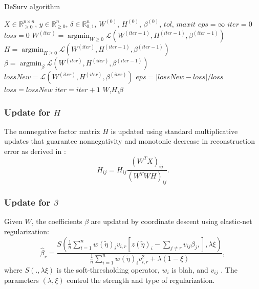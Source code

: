 \documentclass[9pt,twocolumn,twoside,]{pnas-new}
\begin{document}
\begin{algorithm}
\caption{DeSurv algorithm}\label{deSurv}
    \begin{algorithmic}[1]
        \Require $X \in \mathbb{R}_{\geq 0}^{p \times n}$, $y \in \mathbb{R}^n_{\geq 0}$, $\delta \in \mathbb{R}_{0,1}^{n}$, $W^{(0)}$, $H^{(0)}$, $\beta^{(0)}$, $tol$, $maxit$
        \State $eps = \infty$
        \State $iter = 0$
        \State $loss = 0$
            \State $W^{(iter)} = \mathop{\mathrm{argmin}}_{W \geq 0} \mathcal{L}(W^{(iter-1)},H^{(iter-1)},\beta^{(iter-1)})$
            \State $H = \mathop{\mathrm{argmin}}_{H \geq 0} \mathcal{L}(W^{(iter)},H^{(iter-1)},\beta^{(iter-1)})$
            \State $\beta = \mathop{\mathrm{argmin}}_{\beta} \mathcal{L}(W^{(iter)},H^{(iter)},\beta^{(iter-1)})$
            \State $lossNew = \mathcal{L}(W^{(iter)},H^{(iter)},\beta^{(iter)})$
            \State $eps = |lossNew - loss|/loss$
            \State $loss = lossNew$
            \State $iter = iter + 1$
        \EndWhile
        \Return $W$,$H$,$\beta$
    \end{algorithmic}
\end{algorithm}

\subsubsection*{\texorpdfstring{Update for
\(H\)}{Update for H}}\label{update-for-h}

The nonnegative factor matrix \(H\) is updated using standard
multiplicative updates that guarantee nonnegativity and monotonic
decrease in reconstruction error as derived in \cite{@lee}:
\begin{equation}
\label{H_update}
    H_{ij} = H_{ij} \frac{(W^TX)_{ij}}{(W^TWH)_{ij}}.
\end{equation}

\subsubsection*{\texorpdfstring{Update for
\(\beta\)}{Update for \textbackslash beta}}\label{update-for-beta}

Given \(W\), the coefficients \(\beta\) are updated by coordinate
descent using elastic-net regularization: \begin{equation}
\label{beta_update}
    \hat{\beta}_r = \frac{S(\frac{1}{n}\sum_{i=1}^n w(\tilde{\eta})_i v_{i,r} \left[ z(\tilde{\eta})_i - \sum_{j\ne r} v_{ij} \beta_j,\right], \lambda\xi)}{\frac{1}{n}\sum_{i=1}^n w(\tilde{\eta})_i v_{i,r}^2 + \lambda(1-\xi)},
\end{equation} where \(S(.,\lambda\xi)\) is the soft-thresholding
operator, \(w_i\) is blah, and \(v_{ij}\) . The parameters
\((\lambda,\xi)\) control the strength and type of regularization.
\end{document}
